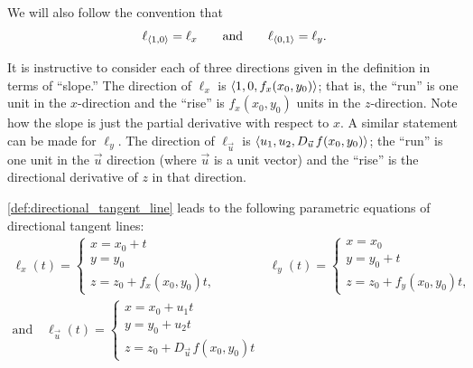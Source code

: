 We will also follow the convention that\vspace{-.5\baselineskip}
\[
\ell_{\bracket{1,0}}=\ell_x
\qquad\text{and}\qquad
\ell_{\bracket{0,1}}=\ell_y.\vspace{-.5\baselineskip}
\]

It is instructive to consider each of three directions given in the definition in terms of ``slope.'' The direction of $\ell_x$ is $\left\langle 1,0,f_x(x_0,y_0)\right\rangle$; that is, the ``run'' is one unit in the $x$-direction and the ``rise'' is $f_x(x_0,y_0)$ units in the $z$-direction. Note how the slope is just the partial derivative with respect to $x$. A similar statement can be made for $\ell_y$. The direction of $\ell_{\vec u}$ is $\left\langle u_1,u_2,D_{\vec u\,}f(x_0,y_0)\right\rangle$; the ``run'' is one unit in the $\vec u$ direction (where $\vec u$ is a unit vector) and the ``rise'' is the directional derivative of $z$ in that direction.


\autoref{def:directional_tangent_line} leads to the following parametric equations of directional tangent lines:
\begin{gather*}
 \ell_x(t)
 =\begin{cases}x=x_0+t \\ y=y_0\\z=z_0+f_x(x_0,y_0)t, \end{cases}\qquad\qquad
 \ell_y(t)
 =\begin{cases}x=x_0 \\ y=y_0+t\\z=z_0+f_y(x_0,y_0)t, \end{cases}\\
 \text{and}\quad
 \ell_{\vec u}(t)
 =\begin{cases}x=x_0+u_1t \\ y=y_0+u_2t\\z=z_0+D_{\vec u\,}f(x_0,y_0)t\end{cases}
\end{gather*}

